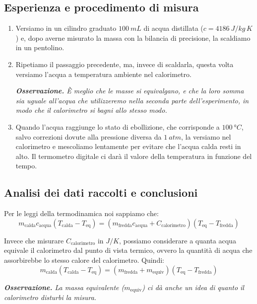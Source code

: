 \documentclass{article}
\begin{document}
\subsection{Esperienza e procedimento di misura}
    
\begin{enumerate}
    \item
        Versiamo in un cilindro graduato $\qty{100}{mL}$ di acqua distillata
        ($c=\qty{4186}{J \per kg\,K}$) e, dopo averne misurato la massa con
        la bilancia di precisione, la scaldiamo in un pentolino.
    \item
        Ripetiamo il passaggio precedente, ma, invece di scaldarla, questa volta
        versiamo l'acqua a temperatura ambiente nel calorimetro.
        
    \emph{
        \textbf{Osservazione.} È meglio che le masse si equivalgano, e che la loro
        somma sia uguale all'acqua che utilizzeremo nella seconda parte dell'esperimento,
        in modo che il calorimetro si bagni allo stesso modo.
        }
        
    \item
        Quando l'acqua raggiunge lo stato di ebollizione, che corrisponde a 
        $\qty{100}{\degree C}$, salvo correzioni dovute alla pressione diversa da
        $\qty{1}{atm}$, la versiamo nel calorimetro e mescoliamo lentamente
        per evitare che l'acqua calda resti in alto. Il termometro digitale ci
        darà il valore della temperatura in funzione del tempo.
\end{enumerate}
        
\subsection{Analisi dei dati raccolti e conclusioni}
Per le leggi della termodinamica noi sappiamo che:
    \[
        m_\text{calda} c_\text{acqua} (T_\text{calda}-T_\text{eq}) =
        (m_\text{fredda} c_\text{acqua} + C_\text{calorimetro})(T_\text{eq}-T_\text{fredda})
    \]

Invece che misurare $C_\text{calorimetro}$ in $\unit{J\per K}$, possiamo considerare a
quanta acqua equivale il calorimetro dal punto di vista termico, ovvero la quantità di
acqua che assorbirebbe lo stesso calore del calorimetro. Quindi:
    \[
        m_\text{calda} (T_\text{calda}-T_\text{eq}) =
        (m_\text{fredda} + m_\text{equiv})(T_\text{eq}-T_\text{fredda})
    \]

    \emph{
        \textbf{Osservazione.} La massa equivalente ($m_\text{equiv}$) ci dà anche un idea di
        quanto il calorimetro disturbi la misura.
        }
\end{document}
